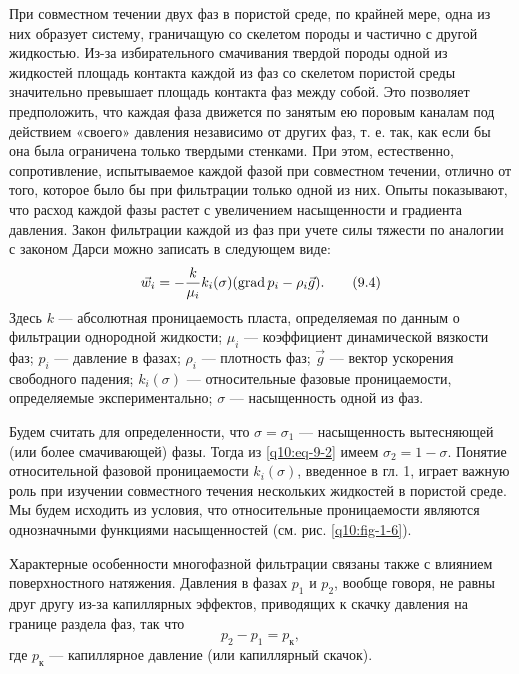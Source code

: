 При совместном течении двух фаз в пористой среде, по крайней мере, одна из них образует систему, граничащую со скелетом породы и частично с другой жидкостью. Из-за избирательного смачивания твердой породы одной из жидкостей площадь контакта каждой из фаз со скелетом пористой среды значительно превышает площадь контакта фаз между собой. Это позволяет предположить, что каждая фаза движется по занятым ею поровым каналам под действием «своего» давления независимо от других фаз, т. е. так, как если бы она была ограничена только твердыми стенками. При этом, естественно, сопротивление, испытываемое каждой фазой при совместном течении, отлично от того, которое было бы при фильтрации только одной из них. Опыты показывают, что расход каждой фазы растет с увеличением насыщенности и градиента давления. Закон фильтрации каждой из фаз при учете силы тяжести по аналогии с законом Дарси можно записать в следующем виде:
\begin{equation}\vec w_i=-\frac{k}{\mu_i}k_i(\sigma)(\operatorname{grad} p_i-\rho_i\vec g).\tag{9.4}\label{q10:eq-9-4}\end{equation}
Здесь $k$ --- абсолютная проницаемость пласта, определяемая по данным о фильтрации однородной жидкости; $\mu_i$ --- коэффициент динамической вязкости фаз; $p_i$ --- давление в фазах; $\rho_i$ --- плотность фаз; $\vec g$ --- вектор ускорения свободного падения; $k_i(\sigma)$ --- относительные фазовые проницаемости, определяемые экспериментально; $\sigma$ --- насыщенность одной из фаз.

Будем считать для определенности, что $\sigma=\sigma_1$ --- насыщенность вытесняющей (или более смачивающей) фазы. Тогда из \eqref{q10:eq-9-2} имеем $\sigma_2=1-\sigma$. Понятие относительной фазовой проницаемости $k_i(\sigma)$, введенное в гл. 1, играет важную роль при изучении совместного течения нескольких жидкостей в пористой среде. Мы будем исходить из условия, что относительные проницаемости являются однозначными функциями насыщенностей (см. рис. \ref{q10:fig-1-6}).

Характерные особенности многофазной фильтрации связаны также с влиянием поверхностного натяжения. Давления в фазах $p_1$ и $p_2$, вообще говоря, не равны друг другу из-за капиллярных эффектов, приводящих к скачку давления на границе раздела фаз, так что
\begin{equation}p_2-p_1=p_\text{к},\tag{9.5}\label{q10:eq-9-5}\end{equation}
где $p_\text{к}$ --- капиллярное давление (или капиллярный скачок).


